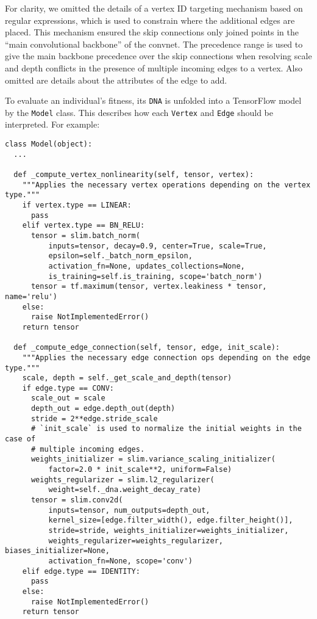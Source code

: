 \documentclass{article}
\begin{document}
For clarity, we omitted the details of a vertex ID targeting mechanism based on regular expressions, which is used to constrain where the additional edges are placed. This mechanism ensured the skip connections only joined points in the ``main convolutional backbone'' of the convnet. The precedence range is used to give the main backbone precedence over the skip connections when resolving scale and depth conflicts in the presence of multiple incoming edges to a vertex. Also omitted are details about the attributes of the edge to add.

To evaluate an individual's fitness, its \lstinline{DNA} is unfolded into a TensorFlow model by the \lstinline{Model} class. This describes how each \lstinline{Vertex} and \lstinline{Edge} should be interpreted. For example:
\smallskip
\begin{lstlisting}
class Model(object):
  ...

  def _compute_vertex_nonlinearity(self, tensor, vertex):
    """Applies the necessary vertex operations depending on the vertex type."""
    if vertex.type == LINEAR:
      pass
    elif vertex.type == BN_RELU:
      tensor = slim.batch_norm(
          inputs=tensor, decay=0.9, center=True, scale=True,
          epsilon=self._batch_norm_epsilon,
          activation_fn=None, updates_collections=None,
          is_training=self.is_training, scope='batch_norm')
      tensor = tf.maximum(tensor, vertex.leakiness * tensor, name='relu')
    else:
      raise NotImplementedError()
    return tensor
    
  def _compute_edge_connection(self, tensor, edge, init_scale):
    """Applies the necessary edge connection ops depending on the edge type."""
    scale, depth = self._get_scale_and_depth(tensor)
    if edge.type == CONV:
      scale_out = scale
      depth_out = edge.depth_out(depth)
      stride = 2**edge.stride_scale
      # `init_scale` is used to normalize the initial weights in the case of
      # multiple incoming edges.
      weights_initializer = slim.variance_scaling_initializer(
          factor=2.0 * init_scale**2, uniform=False)
      weights_regularizer = slim.l2_regularizer(
          weight=self._dna.weight_decay_rate)
      tensor = slim.conv2d(
          inputs=tensor, num_outputs=depth_out,
          kernel_size=[edge.filter_width(), edge.filter_height()],
          stride=stride, weights_initializer=weights_initializer,
          weights_regularizer=weights_regularizer, biases_initializer=None,
          activation_fn=None, scope='conv')
    elif edge.type == IDENTITY:
      pass
    else:
      raise NotImplementedError()
    return tensor
\end{lstlisting}
\end{document}
